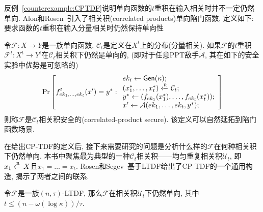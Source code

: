 反例~\ref{counterexample:CPTDF}说明单向函数的$t$重积在输入相关时并不一定仍然单向. 
Alon和Rosen~\cite{RS-TCC-2009}引入了相关积(correlated products)单向陷门函数, 定义如下: 要求函数的$t$重积在输入分量相关时仍然保持单向性

\begin{definition}[相关积单向性]
令$\mathcal{F}: X \rightarrow Y$是一族单向函数, $\mathcal{C}_t$是定义在$X^t$上的分布(分量相关). 
如果$\mathcal{F}$的$t$重积$\mathcal{F}^t: X^t \rightarrow Y^t$在$\mathcal{C}_t$相关积下仍然是单向的, 
(即对于任意PPT敌手$\mathcal{A}$, 其在如下的安全实验中优势是可忽略的) 
\begin{displaymath}
\Pr \left[
f^t_{ek_1, \dots, ek_t}(x') = y^*: 
\begin{array}{l}
    ek_i \leftarrow \mathsf{Gen}(\kappa);\\
    (x_1^*, \dots, x_t^*) \xleftarrow{\textup{\tiny R}} \mathcal{C}_t; \\
    y^* \leftarrow (f_{ek_1}(x_1^*), \dots, f_{ek_t}(x_t^*));\\
    x' \leftarrow \mathcal{A}(ek_1, \dots, ek_t, y^*);\\
\end{array} 
\right]
\end{displaymath}
则称$\mathcal{F}$是$\mathcal{C}_t$相关积安全的(correlated-product secure). 该定义可以自然延拓到陷门函数场景.   
\end{definition}

在给出CP-TDF的定义后, 接下来需要研究的问题是分析什么样的$\mathcal{F}$在何种相关积下仍然单向. 
本书中聚焦最为典型的一种$\mathcal{C}_t$相关积——均匀重复相关积$\mathcal{U}_t$, 即$x_1 \xleftarrow{\textup{\tiny R}} X$且$x_1 =  \dots = x_t$. 
Rosen和Segev~\cite{RS-TCC-2009}基于LTDF给出了CP-TDF的一个通用构造, 揭示了两者之间的联系. 

\begin{theorem}
令$\mathcal{F}$是一族$(n, \tau)$-LTDF, 那么$\mathcal{F}$在相关积$\mathcal{U}_t$下仍然单向, 
其中$t \leq (n-\omega(\log \kappa))/\tau$.  
\end{theorem}

